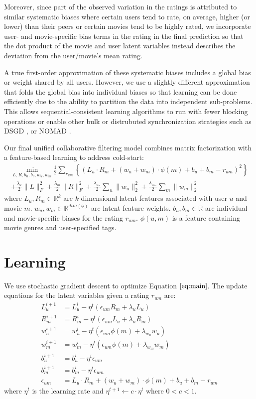 \documentclass{article} %
\begin{document}
	Moreover, since part of the observed variation in the ratings is attributed to similar systematic biases \cite{koren:matrix} where certain users tend to rate, on average, higher (or lower) than their peers or certain movies tend to be highly rated, we incorporate user- and movie-specific bias terms in the rating in the final prediction so that the dot product of the movie and user latent variables instead describes the deviation from the user/movie's mean rating.
	
	A true first-order approximation of these systematic biases includes a global bias or weight shared by all users. However, we use a slightly different approximation that folds the global bias into individual biases so that learning can be done efficiently due to the ability to  partition the data into independent sub-problems. This allows sequential-consistent learning algorithms to run with fewer blocking operations or enable other bulk or distrubuted synchronization strategies such as DSGD \cite{gemulla2011large}, or NOMAD \cite{yun2013nomad}.
	
	Our final unified collaborative filtering model combines matrix factorization with a feature-based learning to address cold-start:
	\begin{multline}
	\min_{L, R, b_u, b_v, w_u, w_m} \frac{1}{2}\sum_{r_{um}} \left\{(L_u \cdot R_m + (w_u + w_m) \cdot \phi(m) + b_u + b_m - r_{um})^2\right\}\\ + \frac{\lambda_u}{2}\|L\|^2_F + \frac{\lambda_m}{2}\|R\|^2_F + \frac{\lambda_{w_u}}{2}\sum_u\|w_u\|^2_2 + \frac{\lambda_{w_m}}{2}\sum_m\|w_m\|^2_2\label{eq:main}
	\end{multline}
	where $L_u, R_m \in \mathbb{R}^k$ are $k$ dimensional latent features associated with user $u$ and movie $m$. $w_u,w_m \in \mathbb{R}^{dim(\phi)}$ are latent feature weights. $b_u, b_m \in \mathbb{R}$ are individual and movie-specific biases for the rating $r_{um}$. $\phi(u, m)$ is a feature containing movie genres and user-specified tags. 
	\section{Learning}
	We use stochastic gradient descent to optimize Equation $\ref{eq:main}$. The update equations for the latent variables given a rating $r_{um}$ are:
	\begin{align}
	L_u^{i+1} &= L_u^{i} - \eta^t ( \epsilon_{um} R_m  + \lambda_u L_u)\\
	R_m^{i+1} &= R_m^{i} - \eta^t ( \epsilon_{um} L_u  + \lambda_u R_m)\\
	w_u^{i+1} &= w_u^{i} - \eta^t ( \epsilon_{um} \phi(m) + \lambda_{w_u} w_u)\\
	w_m^{i+1} &= w_m^{i} - \eta^t ( \epsilon_{um} \phi(m) + \lambda_{w_m} w_m)\\
	b_u^{i+1} &= b_u^{i} - \eta^t \epsilon_{um}\\
	b_m^{i+1} &= b_m^{i} - \eta^t \epsilon_{um}\\
	\epsilon_{um} &= L_u \cdot R_m + (w_u + w_m) \cdot \phi(m) + b_u + b_m - r_{um}
	\end{align}
	where $\eta^t$ is the learning rate and $\eta^{t+1} \leftarrow c \cdot \eta^t$ where $0 < c < 1$.
\end{document}
